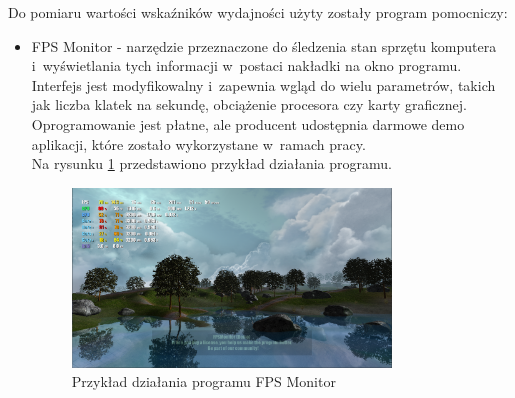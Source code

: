 \documentclass[a4paper,twoside,12pt]{book}
\begin{document}
Do pomiaru wartości wskaźników wydajności użyty zostały program pomocniczy:
\begin{itemize}
    \item FPS Monitor - narzędzie przeznaczone do śledzenia stan sprzętu komputera i~wyświetlania tych informacji w~postaci nakładki na okno programu. Interfejs jest modyfikowalny i~zapewnia wgląd do wielu parametrów, takich jak liczba klatek na sekundę, obciążenie procesora czy karty graficznej. \\
    Oprogramowanie jest płatne, ale producent udostępnia darmowe demo aplikacji, które zostało wykorzystane w~ramach pracy. \\
    Na rysunku \ref{fig:fps_monitor} przedstawiono przykład działania programu.
    \begin{figure}[H]
        \centering
        \includegraphics[width=0.8\textwidth]{res/fps_monitor.png}
        \caption{Przykład działania programu FPS Monitor}
        \label{fig:fps_monitor}
    \end{figure}
\end{itemize}
\end{document}

